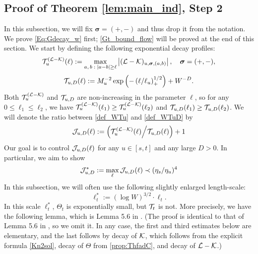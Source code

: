\subsection{Proof of Theorem \ref{lem:main_ind}, Step 2}
In this subsection, we will fix $\boldsymbol{\sigma}=(+,-)$ and thus drop it from the notation.  We prove \eqref{Eq:Gdecay_w} first;  \eqref{Gt_bound_flow} will be proved at the end of this  section. 
We start by defining the following exponential decay profiles:
\begin{equation}\label{def_WTu}
      {\cal T}^{(\cal L-K)}_u (\ell):= \max_{a,\,b\; : \; |a-b|\ge \ell} \left| ({\cal L-K})_{u,  \boldsymbol{\sigma},  ( a, b)}\right|,\quad  \boldsymbol{\sigma}=(+,-),
\end{equation}
\begin{equation}\label{def_WTuD}
{\cal T} _{u, D} (\ell) := M_{u}^{-2}
\exp \left(- \left( \ell /\ell_u \right)_+^{1/2} \right)+W^{-D}.
\end{equation} 
Both  ${\cal T}^{(\cal L-K)}_u$ and ${\cal T} _{u, D}$ are non-increasing in the parameter $\ell$, so for any $0\leq\ell_{1}\leq\ell_{2}$, we have 
 ${\cal T}^{(\cal L-K)}_u (\ell_1)\ge {\cal T}^{(\cal L-K)}_u (\ell_2)$ and ${\cal T} _{u,D} (\ell_1)\ge{\cal T} _{u,D}(\ell_2)$. We will denote the ratio between \eqref{def_WTu} and \eqref{def_WTuD} by  %
\begin{equation}\label{def_Ju}
     {\cal J} _{u,D} (\ell):=   \left({\cal T}^{(\cal L-K)}_u (\ell) \Big/{\cal T}_{u,D} (\ell)\right)+1
\end{equation} 
Our goal is to control $ {\cal J} _{u,D} (\ell)$ for any $u\in [s,t]$ and any large $D>0$. In particular, we aim to show 
 \begin{align}\label{shoellJJ}
    {\cal J}^* _{u,D} :=\max_{\ell}   {\cal J} _{u,D} (\ell)\prec (\eta_s/\eta_u)^4 
  \end{align}
In this subsection, we will often use the following slightly enlarged length-scale:
$$
  \ell^{*}_t := (\log W)^{3/2}\cdot \ell_t .
$$
In this scale $\ell_t^*$,  $\Theta_t$ is exponentially small, but ${\cal T}_t$ is not. 
More precisely, we have the following lemma, which is Lemma 5.6 in \cite{YY_25}. (The proof is identical to that of Lemma 5.6 in \cite{YY_25}, so we omit it. In any case, the first and third estimates below are elementary, and the last follows by decay of ${\cal K}$, which follows from the explicit formula \eqref{Kn2sol}, decay of $\Theta$ from \eqref{prop:ThfadC}, and decay of ${\cal L}-{\cal K}$.)

